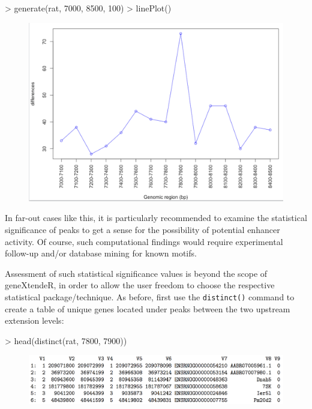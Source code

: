 \documentclass[12pt]{article}
\begin{document}
\begin{Schunk}
\begin{Sinput}
> generate(rat, 7000, 8500, 100)
> linePlot()
\end{Sinput}
\end{Schunk}

\begin{figure}[H]
\centering
\includegraphics{figures/fig4.png}
\end{figure}

In far-out cases like this, it is particularly recommended to examine the statistical significance of peaks to get a sense for the possibility of potential enhancer activity.  Of course, such computational findings would require experimental follow-up and/or database mining for known motifs.  

Assessment of such statistical significance values is beyond the scope of geneXtendeR, in order to allow the user freedom to choose the respective statistical package/technique.  As before, first use the \texttt{distinct()} command to create a table of unique genes located under peaks between the two upstream extension levels:

\begin{Schunk}
\begin{Sinput}
> head(distinct(rat, 7800, 7900))
\end{Sinput}
\end{Schunk}

\begin{figure}[H]
\centering
\includegraphics{figures/table2.png}
\end{figure}
\end{document}

